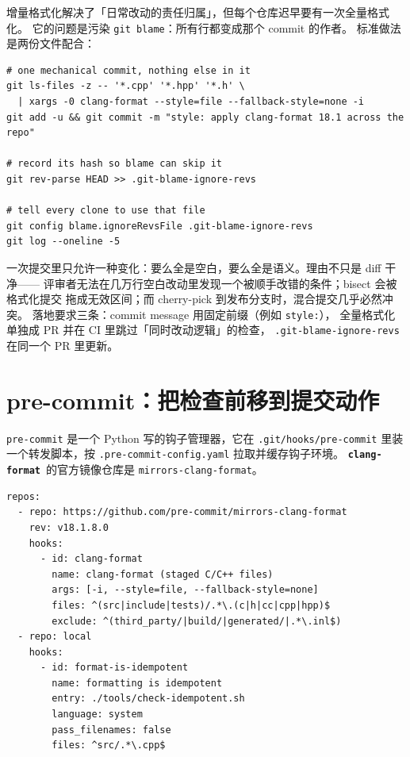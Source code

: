 \documentclass[12pt,a4paper,fontset=fandol]{ctexbook}
\newcommand{\Lib}[1]{\textbf{\texttt{#1}}}
\newcommand{\Fmt}{\Lib{clang-format}}
\begin{document}
增量格式化解决了「日常改动的责任归属」，但每个仓库迟早要有一次全量格式化。
它的问题是污染 \texttt{git blame}：所有行都变成那个 commit 的作者。
标准做法是两份文件配合：

\begin{lstlisting}[style=shellstyle,caption={全量格式化提交与 blame 屏蔽},label={lst:ch10-blame}]
# one mechanical commit, nothing else in it
git ls-files -z -- '*.cpp' '*.hpp' '*.h' \
  | xargs -0 clang-format --style=file --fallback-style=none -i
git add -u && git commit -m "style: apply clang-format 18.1 across the repo"

# record its hash so blame can skip it
git rev-parse HEAD >> .git-blame-ignore-revs

# tell every clone to use that file
git config blame.ignoreRevsFile .git-blame-ignore-revs
git log --oneline -5
\end{lstlisting}

\begin{bestpractice}[title={格式化提交与逻辑提交分离}]
  一次提交里只允许一种变化：要么全是空白，要么全是语义。理由不只是 diff 干净——
  评审者无法在几万行空白改动里发现一个被顺手改错的条件；bisect 会被格式化提交
  拖成无效区间；而 cherry-pick 到发布分支时，混合提交几乎必然冲突。
  落地要求三条：commit message 用固定前缀（例如 \texttt{style:}），
  全量格式化单独成 PR 并在 CI 里跳过「同时改动逻辑」的检查，
  \texttt{.git-blame-ignore-revs} 在同一个 PR 里更新。
\end{bestpractice}

\section{pre-commit：把检查前移到提交动作}\label{sec:ch10-s4}

\texttt{pre-commit} 是一个 Python 写的钩子管理器，它在 \texttt{.git/hooks/pre-commit}
里装一个转发脚本，按 \texttt{.pre-commit-config.yaml} 拉取并缓存钩子环境。
\Fmt\ 的官方镜像仓库是 \texttt{mirrors-clang-format}。

\begin{lstlisting}[style=yamlstyle,caption={仓库根 \texttt{.pre-commit-config.yaml}},label={lst:ch10-precommit}]
repos:
  - repo: https://github.com/pre-commit/mirrors-clang-format
    rev: v18.1.8.0
    hooks:
      - id: clang-format
        name: clang-format (staged C/C++ files)
        args: [-i, --style=file, --fallback-style=none]
        files: ^(src|include|tests)/.*\.(c|h|cc|cpp|hpp)$
        exclude: ^(third_party/|build/|generated/|.*\.inl$)
  - repo: local
    hooks:
      - id: format-is-idempotent
        name: formatting is idempotent
        entry: ./tools/check-idempotent.sh
        language: system
        pass_filenames: false
        files: ^src/.*\.cpp$
\end{lstlisting}
\end{document}
